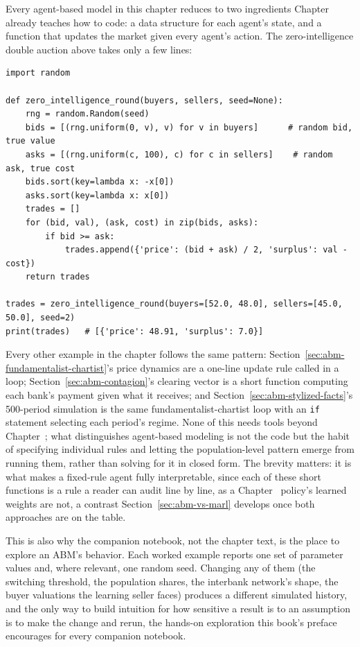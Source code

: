 \documentclass[../ai_in_finance]{subfiles}
\begin{document}
Every agent-based model in this chapter reduces to two ingredients Chapter~ already teaches how to code: a data structure for each agent's state, and a function that updates the market given every agent's action. The zero-intelligence double auction above takes only a few lines:
\begin{verbatim}
import random

def zero_intelligence_round(buyers, sellers, seed=None):
    rng = random.Random(seed)
    bids = [(rng.uniform(0, v), v) for v in buyers]      # random bid, true value
    asks = [(rng.uniform(c, 100), c) for c in sellers]    # random ask, true cost
    bids.sort(key=lambda x: -x[0])
    asks.sort(key=lambda x: x[0])
    trades = []
    for (bid, val), (ask, cost) in zip(bids, asks):
        if bid >= ask:
            trades.append({'price': (bid + ask) / 2, 'surplus': val - cost})
    return trades

trades = zero_intelligence_round(buyers=[52.0, 48.0], sellers=[45.0, 50.0], seed=2)
print(trades)   # [{'price': 48.91, 'surplus': 7.0}]
\end{verbatim}
Every other example in the chapter follows the same pattern: Section~\ref{sec:abm-fundamentalist-chartist}'s price dynamics are a one-line update rule called in a loop; Section~\ref{sec:abm-contagion}'s clearing vector is a short function computing each bank's payment given what it receives; and Section~\ref{sec:abm-stylized-facts}'s 500-period simulation is the same fundamentalist-chartist loop with an \texttt{if} statement selecting each period's regime. None of this needs tools beyond Chapter~; what distinguishes agent-based modeling is not the code but the habit of specifying individual rules and letting the population-level pattern emerge from running them, rather than solving for it in closed form. The brevity matters: it is what makes a fixed-rule agent fully interpretable, since each of these short functions is a rule a reader can audit line by line, as a Chapter~ policy's learned weights are not, a contrast Section~\ref{sec:abm-vs-marl} develops once both approaches are on the table.

This is also why the companion notebook, not the chapter text, is the place to explore an ABM's behavior. Each worked example reports one set of parameter values and, where relevant, one random seed. Changing any of them (the switching threshold, the population shares, the interbank network's shape, the buyer valuations the learning seller faces) produces a different simulated history, and the only way to build intuition for how sensitive a result is to an assumption is to make the change and rerun, the hands-on exploration this book's preface encourages for every companion notebook.
\end{document}
